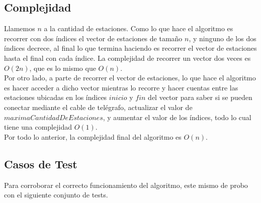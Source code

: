 \documentclass[10pt, a4paper]{article}
\begin{document}
\subsection{Complejidad}

Llamemos $n$ a la cantidad de estaciones. Como lo que hace el algoritmo es recorrer con dos \'indices el vector de estaciones de tama\~no $n$, y ninguno de los dos \'indices decrece, al final lo que termina haciendo es recorrer el vector de estaciones hasta el final con cada \'indice. La complejidad de recorrer un vector dos veces es $O(2n)$, que es lo mismo que $O(n)$.\\
Por otro lado, a parte de recorrer el vector de estaciones, lo que hace el algoritmo es hacer acceder a dicho vector mientras lo recorre y hacer cuentas entre las estaciones ubicadas en los \'indices $inicio$ y $fin$ del vector para saber si se pueden conectar mediante el cable de tel\'egrafo, actualizar el valor de $maximaCantidadDeEstaciones$, y aumentar el valor de los \'indices, todo lo cual tiene una complejidad $O(1)$.\\
Por todo lo anterior, la complejidad final del algoritmo es $O(n)$.

\subsection{Casos de Test}

Para corroborar el correcto funcionamiento del algoritmo, este mismo de probo con el siguiente conjunto de tests.
\end{document}
